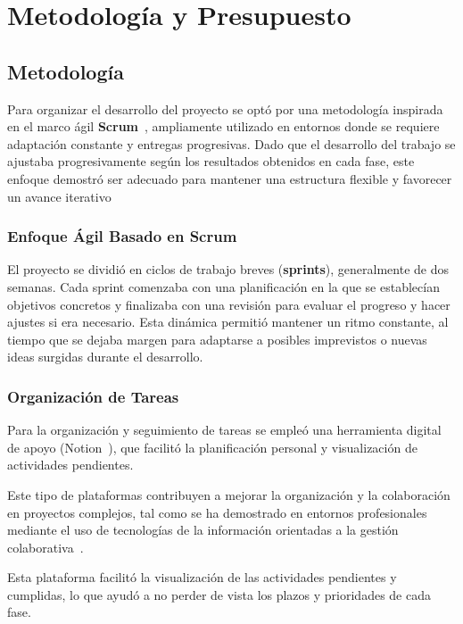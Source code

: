 
\chapter{Metodología y Presupuesto}\label{ch:metodologia-y-presupuesto}
\section{Metodología}\label{sec:metodologia}
Para organizar el desarrollo del proyecto se optó por una metodología inspirada en el marco ágil
\textbf{Scrum}~\cite{ScrumGuide}, ampliamente utilizado en entornos donde se requiere adaptación constante y
entregas progresivas.
Dado que el desarrollo del trabajo se ajustaba progresivamente según los resultados obtenidos en cada fase,
este enfoque demostró ser adecuado para mantener una estructura flexible y favorecer un avance iterativo

\subsection{Enfoque Ágil Basado en Scrum}\label{subsec:enfoque-agil-basado-en-scrum}
El proyecto se dividió en ciclos de trabajo breves (\textbf{sprints}), generalmente de dos semanas.
Cada sprint comenzaba con una planificación en la que se establecían objetivos concretos y finalizaba con una revisión
para evaluar el progreso y hacer ajustes si era necesario.
Esta dinámica permitió mantener un ritmo constante, al tiempo que se dejaba margen para adaptarse a posibles
imprevistos o nuevas ideas surgidas durante el desarrollo.

\subsection{Organización de Tareas}\label{subsec:organizacion-de-tareas}
Para la organización y seguimiento de tareas se empleó una herramienta digital de apoyo (Notion~\cite{NotionGestionTareas}),
que facilitó la planificación personal y visualización de actividades pendientes.


Este tipo de plataformas contribuyen a mejorar la organización y la colaboración en proyectos complejos,
tal como se ha demostrado en entornos profesionales mediante el uso de tecnologías de la información orientadas a la gestión colaborativa~\cite{EnhancingCollaborationProjectbased}.


Esta plataforma facilitó la visualización de las actividades pendientes y cumplidas, lo que ayudó a no perder de vista
los plazos y prioridades de cada fase.


